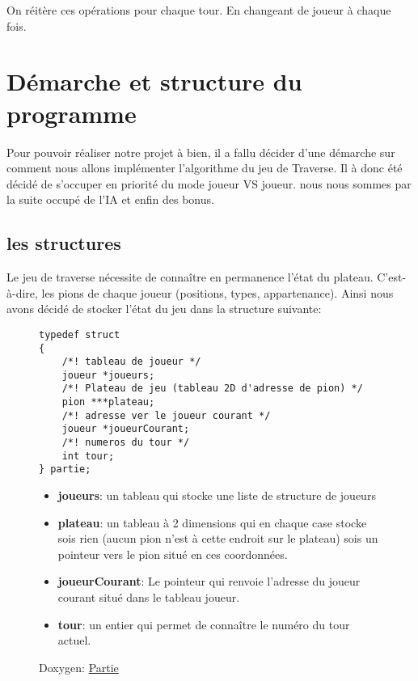 \documentclass{article}
\begin{document}
On réitère ces opérations pour chaque tour. En changeant de joueur à chaque fois.

\pagebreak

\section{Démarche et structure du programme}
Pour pouvoir réaliser notre projet à bien, il a fallu décider d'une démarche sur comment nous allons implémenter l'algorithme du jeu de Traverse.
Il à donc été décidé de s'occuper en priorité du mode joueur VS joueur. nous nous sommes par la suite occupé de l'IA et enfin des bonus.

    \subsection{les structures}
        Le jeu de traverse nécessite de connaître en permanence l'état du plateau. C'est-à-dire, les pions de chaque joueur (positions, types, appartenance). 
        Ainsi nous avons décidé de stocker l'état du jeu dans la structure suivante: 
        \begin{figure}[!h]
            \centering
            \begin{minipage}{8cm}
                \begin{lstlisting}
typedef struct
{
    /*! tableau de joueur */
    joueur *joueurs;
    /*! Plateau de jeu (tableau 2D d'adresse de pion) */
    pion ***plateau;
    /*! adresse ver le joueur courant */
    joueur *joueurCourant;
    /*! numeros du tour */
    int tour;
} partie;
                \end{lstlisting}
            \end{minipage}
            \begin{minipage}{7.5cm}
                \begin{itemize}
                    \item \textbf{joueurs}: un tableau qui stocke une liste de structure de joueurs
                    \item \textbf{plateau}: un tableau à 2 dimensions qui en chaque case stocke sois rien (aucun pion n'est à cette endroit sur le plateau) sois un pointeur vers le pion situé en ces coordonnées. 
                    \item \textbf{joueurCourant}: Le pointeur qui renvoie l'adresse du joueur courant situé dans le tableau joueur. 
                    \item \textbf{tour}: un entier qui permet de connaître le numéro du tour actuel.
                \end{itemize}
            \end{minipage}
            \caption*{Doxygen: \href{https://obito.fr/docs/jeuTraversse/structpartie.html}{Partie}}
        \end{figure}
        
\end{document}
